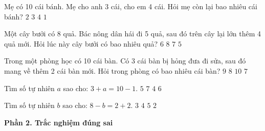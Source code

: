 \begin{ex} %
Mẹ có 10 cái bánh. Mẹ cho anh 3 cái, cho em 4 cái. Hỏi mẹ còn lại bao nhiêu cái bánh?
\choice
{$2$}
{\True $3$}
{$4$}
{$1$}
\end{ex}

\begin{ex} %
Một cây bưởi có 8 quả. Bác nông dân hái đi 5 quả, sau đó trên cây lại lớn thêm 4 quả mới. Hỏi lúc này cây bưởi có bao nhiêu quả?
\choice
{$6$}
{$8$}
{\True $7$}
{$5$}
\end{ex}

\begin{ex} %
Trong một phòng học có 10 cái bàn. Có 3 cái bàn bị hỏng đưa đi sửa, sau đó mang về thêm 2 cái bàn mới. Hỏi trong phòng có bao nhiêu cái bàn?
\choice
{\True $9$}
{$8$}
{$10$}
{$7$}
\end{ex}

\begin{ex} %
Tìm số tự nhiên $a$ sao cho: $3 + a = 10 - 1$.
\choice
{$5$}
{$7$}
{$4$}
{\True $6$}
\end{ex}

\begin{ex} %
Tìm số tự nhiên $b$ sao cho: $8 - b = 2 + 2$.
\choice
{$3$}
{\True $4$}
{$5$}
{$2$}
\end{ex}

\textbf{Phần 2. Trắc nghiệm đúng sai}

